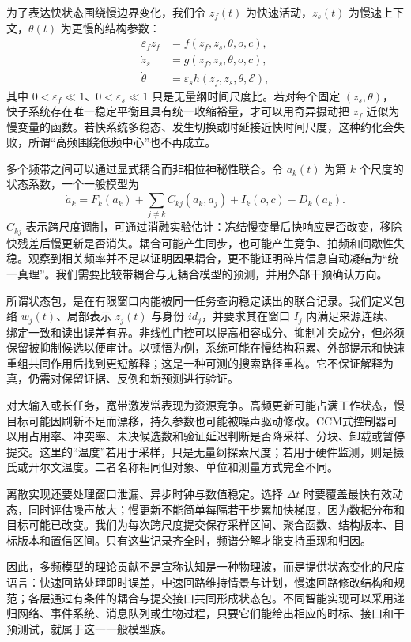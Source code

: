 为了表达快状态围绕慢边界变化，我们令 $z_f(t)$ 为快速活动，$z_s(t)$ 为慢速上下文，$\theta(t)$ 为更慢的结构参数：
\begin{align}
 \varepsilon_f\dot z_f&=f(z_f,z_s,\theta,o,c),\\
 \dot z_s&=g(z_f,z_s,\theta,o,c),\\
 \dot\theta&=\varepsilon_s h(z_f,z_s,\theta,\mathcal E),
\end{align}
其中 $0<\varepsilon_f\ll1$、$0<\varepsilon_s\ll1$ 只是无量纲时间尺度比。若对每个固定 $(z_s,\theta)$，快子系统存在唯一稳定平衡且具有统一收缩裕量，才可以用奇异摄动把 $z_f$ 近似为慢变量的函数。若快系统多稳态、发生切换或时延接近快时间尺度，这种约化会失败，所谓“高频围绕低频中心”也不再成立。

多个频带之间可以通过显式耦合而非相位神秘性联合。令 $a_k(t)$ 为第 $k$ 个尺度的状态系数，一个一般模型为
\begin{equation}
 \dot a_k=F_k(a_k)+\sum_{j\ne k}C_{kj}(a_k,a_j)+I_k(o,c)-D_k(a_k).
\end{equation}
$C_{kj}$ 表示跨尺度调制，可通过消融实验估计：冻结慢变量后快响应是否改变，移除快残差后慢更新是否消失。耦合可能产生同步，也可能产生竞争、拍频和间歇性失稳。观察到相关频率并不足以证明因果耦合，更不能证明碎片信息自动凝结为“统一真理”。我们需要比较带耦合与无耦合模型的预测，并用外部干预确认方向。

所谓状态包，是在有限窗口内能被同一任务查询稳定读出的联合记录。我们定义包络 $w_j(t)$、局部表示 $z_j(t)$ 与身份 $id_j$，并要求其在窗口 $I_j$ 内满足来源连续、绑定一致和读出误差有界。非线性门控可以提高相容成分、抑制冲突成分，但必须保留被抑制候选以便审计。以顿悟为例，系统可能在慢结构积累、外部提示和快速重组共同作用后找到更短解释；这是一种可测的搜索路径重构。它不保证解释为真，仍需对保留证据、反例和新预测进行验证。

对大输入或长任务，宽带激发常表现为资源竞争。高频更新可能占满工作状态，慢目标可能因刷新不足而漂移，持久参数也可能被噪声驱动修改。CCM式控制器可以用占用率、冲突率、未决候选数和验证延迟判断是否降采样、分块、卸载或暂停提交。这里的“温度”若用于采样，只是无量纲探索尺度；若用于硬件监测，则是摄氏或开尔文温度。二者名称相同但对象、单位和测量方式完全不同。

离散实现还要处理窗口泄漏、异步时钟与数值稳定。选择 $\Delta t$ 时要覆盖最快有效动态，同时评估噪声放大；慢更新不能简单每隔若干步累加快梯度，因为数据分布和目标可能已改变。我们为每次跨尺度提交保存采样区间、聚合函数、结构版本、目标版本和置信区间。只有这些记录齐全时，频谱分解才能支持重现和归因。

因此，多频模型的理论贡献不是宣称认知是一种物理波，而是提供状态变化的尺度语言：快速回路处理即时误差，中速回路维持情景与计划，慢速回路修改结构和规范；各层通过有条件的耦合与提交接口共同形成状态包。不同智能实现可以采用递归网络、事件系统、消息队列或生物过程，只要它们能给出相应的时标、接口和干预测试，就属于这一一般模型族。

